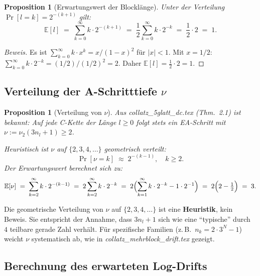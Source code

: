 \documentclass[12pt,a4paper]{article}
\newtheorem{proposition}[definition]{Proposition}
\newenvironment{beweis}{\begin{proof}[Beweis]}{\end{proof}}
\newcommand{\vii}{\nu_2}
\newcommand{\E}{\mathbb{E}}
\begin{document}
\begin{proposition}[Erwartungswert der Blocklänge]
\label{prop:El}
Unter der Verteilung $\Pr[l = k] = 2^{-(k+1)}$ gilt:
\[
  \E[l] \;=\; \sum_{k=0}^{\infty} k \cdot 2^{-(k+1)}
         \;=\; \frac{1}{2}\sum_{k=0}^{\infty} k \cdot 2^{-k}
         \;=\; \frac{1}{2} \cdot 2 \;=\; 1.
\]
\end{proposition}

\begin{beweis}
Es ist $\sum_{k=0}^{\infty} k \cdot x^k = x/(1-x)^2$ für $|x| < 1$.
Mit $x = 1/2$: $\sum_{k=0}^{\infty} k \cdot 2^{-k} = (1/2)/(1/2)^2 = 2$.
Daher $\E[l] = \frac{1}{2} \cdot 2 = 1$.
\end{beweis}

\subsection{Verteilung der A-Schritttiefe $\nu$}

\begin{proposition}[Verteilung von $\nu$]
\label{prop:Enu}
Aus \textit{collatz\_5glatt\_dc.tex} (Thm.~2.1) ist bekannt: Auf jede
C-Kette der Länge $l \geq 0$ folgt stets ein EA-Schritt mit
$\nu := \vii(3n_l+1) \geq 2$.

Heuristisch ist $\nu$ auf $\{2, 3, 4, \ldots\}$ geometrisch verteilt:
\[
  \Pr[\nu = k] \;\approx\; 2^{-(k-1)}, \quad k \geq 2.
\]
Der Erwartungswert berechnet sich zu:
\[
  \E[\nu] \;=\; \sum_{k=2}^{\infty} k \cdot 2^{-(k-1)}
          \;=\; 2\sum_{k=2}^{\infty} k \cdot 2^{-k}
          \;=\; 2\Bigl(\sum_{k=1}^{\infty} k \cdot 2^{-k} - 1 \cdot 2^{-1}\Bigr)
          \;=\; 2\Bigl(2 - \tfrac{1}{2}\Bigr)
          \;=\; 3.
\]
\end{proposition}

\begin{tcolorbox}[warnung]
Die geometrische Verteilung von $\nu$ auf $\{2,3,4,\ldots\}$ ist eine
\textbf{Heuristik}, kein Beweis. Sie entspricht der Annahme, dass
$3n_l + 1$ sich wie eine ``typische'' durch~$4$ teilbare gerade Zahl verhält.
Für spezifische Familien (z.\,B.\ $n_k = 2\cdot 3^N - 1$) weicht $\nu$
systematisch ab, wie in \textit{collatz\_mehrblock\_drift.tex} gezeigt.
\end{tcolorbox}

\subsection{Berechnung des erwarteten Log-Drifts}
\end{document}
